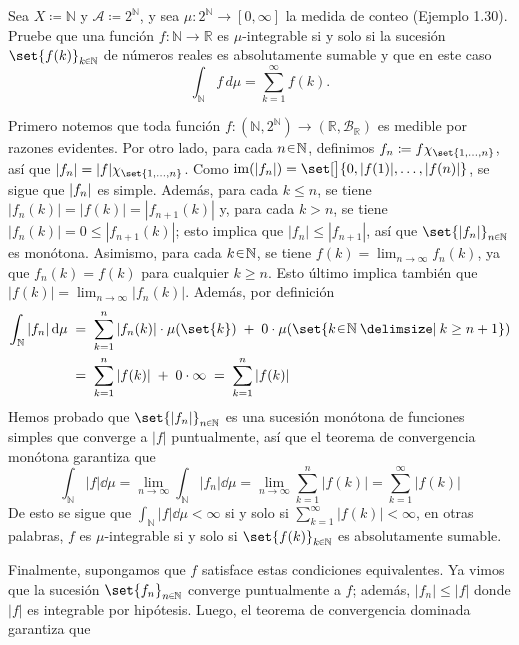 \setcounter{neje}{60}
\begin{nejer}
Sea $X \coloneq \mathbb{N}$ y $\mathcal{A} \coloneq 2^{\mathbb{N}}$, y sea $\mu\colon 2^{\mathbb{N}} \to [0, \infty]$ la medida de conteo (Ejemplo 1.30). Pruebe que una función $f \colon \mathbb{N} \to \mathbb{R}$ es $\mu$-integrable si y solo si la sucesión $\set{f(k)}_{k \en \mathbb{N}}$ de números reales es absolutamente sumable y que en este caso
$$
\int_{\mathbb{N}} f \, d\mu = \sum_{k=1}^{\infty} f(k).
$$
\end{nejer}
\begin{sol}
Primero notemos que toda función $f\colon (\mathbb{N},2^\mathbb{N}) \to (\mathbb{R}, \mathcal{B}_\mathbb{R})$ es medible por razones evidentes. Por otro lado, para cada $n\en\mathbb{N}$, definimos $f_n \coloneq f\chi_{\set{1,\dots,n}}$, así que $\abs{f_n} = \abs{f}\chi_{\set{1,\dots,n}}$.
Como $\im(\abs{f_n}) = \set[\big]{0,\abs{f(1)},\dots,\abs{f(n)}}$, se sigue que $\abs{f_n}$ es simple. Además, para cada $k \leq n$, se tiene $|f_n(k)| = |f(k)| = |f_{n+1}(k)|$ y, para cada $k>n$, se tiene $|f_n(k)| = 0 \leq |f_{n+1}(k)|$; esto implica que $|f_n| \leq |f_{n+1}|$, así que $\set{\abs{f_n}}_{n\en\mathbb{N}}$ es monótona. Asimismo, para cada $k\en\mathbb{N}$, se tiene $f(k) = \lim_{n\to\infty}f_n(k)$, ya que $f_n(k) = f(k)$ para cualquier $k\geq n$. Esto último implica también que $|f(k)| = \lim_{n\to\infty}|f_n(k)|$. Además, por definición
\begin{align*}
    \int_\mathbb{N}|f_n|\dd{\mu}%
    &\;=\; \sum^n_{k=1}|f_n(k)|\cdot\mu(\set{k}) \;+\; 0\cdot\mu(\set{k\en\mathbb{N} \given k\geq n+1})\\
    &\;=\; \sum^n_{k=1}|f(k)| \;+\; 0\cdot\infty%
    \;=\; \sum^n_{k=1}|f(k)|
\end{align*}
Hemos probado que $\set{|f_n|}_{n\en\mathbb{N}}$ es una sucesión monótona de funciones simples que converge a $|f|$ puntualmente, así que el teorema de convergencia monótona garantiza que
\[
\int_\mathbb{N}|f|\dd{\mu} = \lim_{n\to\infty}\int_\mathbb{N}|f_n|\dd{\mu} = \lim_{n\to\infty}\sum^n_{k=1}|f(k)| = \sum^\infty_{k=1}|f(k)|
\]
De esto se sigue que $\int_\mathbb{N}|f|\dd{\mu} < \infty$ si y solo si $\sum^\infty_{k=1}|f(k)| < \infty$, en otras palabras, $f$ es $\mu$-integrable si y solo si $\set{f(k)}_{k\en\mathbb{N}}$ es absolutamente sumable.\par
Finalmente, supongamos que $f$ satisface estas condiciones equivalentes. Ya vimos que la sucesión $\set{f_n}_{n\en\mathbb{N}}$ converge puntualmente a $f$; además, $|f_n| \leq |f|$ donde $|f|$ es integrable por hipótesis. Luego, el teorema de convergencia dominada garantiza que 

\end{sol}
